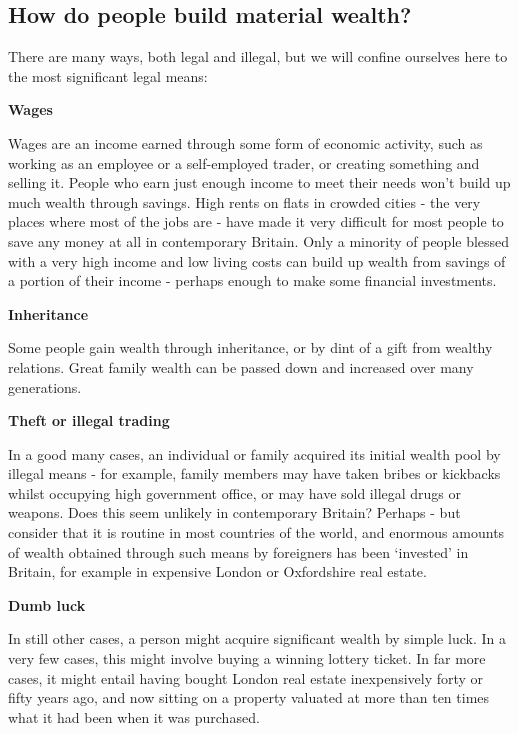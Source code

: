 \documentclass[]{tufte-handout}
\begin{document}
\hypertarget{how-do-people-build-material-wealth}{%
\subsection{How do people build material
wealth?}\label{how-do-people-build-material-wealth}}

There are many ways, both legal and illegal, but we will confine
ourselves here to the most significant legal means:

\textbf{Wages}

Wages are an income earned through some form of economic activity, such
as working as an employee or a self-employed trader, or creating
something and selling it. People who earn just enough income to meet
their needs won't build up much wealth through savings. High rents on
flats in crowded cities - the very places where most of the jobs are -
have made it very difficult for most people to save any money at all in
contemporary Britain. Only a minority of people blessed with a very high
income and low living costs can build up wealth from savings of a
portion of their income - perhaps enough to make some financial
investments.

\textbf{Inheritance}

Some people gain wealth through inheritance, or by dint of a gift from
wealthy relations. Great family wealth can be passed down and increased
over many generations.

\textbf{Theft or illegal trading}

In a good many cases, an individual or family acquired its initial
wealth pool by illegal means - for example, family members may have
taken bribes or kickbacks whilst occupying high government office, or
may have sold illegal drugs or weapons. Does this seem unlikely in
contemporary Britain? Perhaps - but consider that it is routine in most
countries of the world, and enormous amounts of wealth obtained through
such means by foreigners has been `invested' in Britain, for example in
expensive London or Oxfordshire real estate.

\textbf{Dumb luck}

In still other cases, a person might acquire significant wealth by
simple luck. In a very few cases, this might involve buying a winning
lottery ticket. In far more cases, it might entail having bought London
real estate inexpensively forty or fifty years ago, and now sitting on a
property valuated at more than ten times what it had been when it was
purchased.
\end{document}
